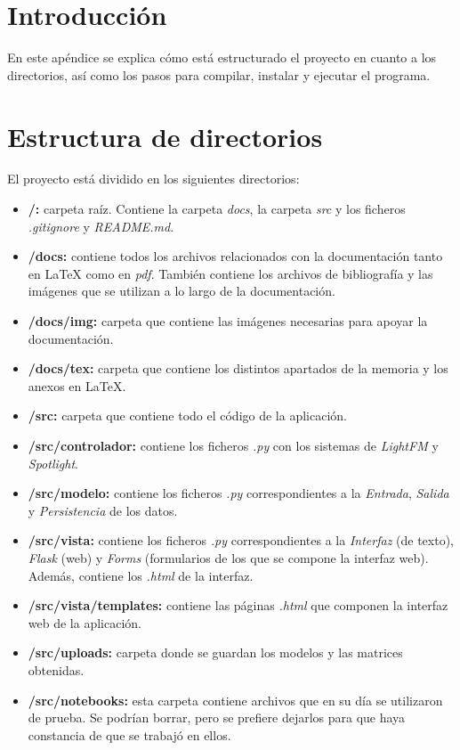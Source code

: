 
\section{Introducción}
En este apéndice se explica cómo está estructurado el proyecto en cuanto a los directorios, así como los pasos para compilar, instalar y ejecutar el programa.

\section{Estructura de directorios}
El proyecto está dividido en los siguientes directorios:
\begin{itemize}
\tightlist
\item \textbf{/:} carpeta raíz. Contiene la carpeta \textit{docs}, la carpeta \textit{src} y los ficheros \textit{.gitignore} y \textit{README.md}.
\item \textbf{/docs:} contiene todos los archivos relacionados con la documentación tanto en \LaTeX{} como en \textit{pdf}. También contiene los archivos de bibliografía y las imágenes que se utilizan a lo largo de la documentación.
\item \textbf{/docs/img:} carpeta que contiene las imágenes necesarias para apoyar la documentación.
\item \textbf{/docs/tex:} carpeta que contiene los distintos apartados de la memoria y los anexos en \LaTeX{}.
\item \textbf{/src:} carpeta que contiene todo el código de la aplicación.
\item \textbf{/src/controlador:} contiene los ficheros \textit{.py} con los sistemas de \textit{LightFM} y \textit{Spotlight}.
\item \textbf{/src/modelo:} contiene los ficheros \textit{.py} correspondientes a la \textit{Entrada}, \textit{Salida} y \textit{Persistencia} de los datos.
\item \textbf{/src/vista:} contiene los ficheros \textit{.py} correspondientes a la \textit{Interfaz} (de texto), \textit{Flask} (web) y \textit{Forms} (formularios de los que se compone la interfaz web). Además, contiene los \textit{.html} de la interfaz.
\item \textbf{/src/vista/templates:} contiene las páginas \textit{.html} que componen la interfaz web de la aplicación.
\item \textbf{/src/uploads:} carpeta donde se guardan los modelos y las matrices obtenidas.
\item \textbf{/src/notebooks:} esta carpeta contiene archivos que en su día se utilizaron de prueba. Se podrían borrar, pero se prefiere dejarlos para que haya constancia de que se trabajó en ellos.
\end{itemize}

